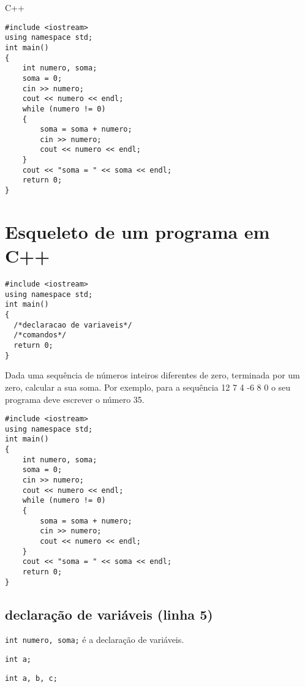 \documentclass[a4paper]{memoir}
\begin{document}
\begin{ex}[C++]
C++

\begin{lstlisting}
#include <iostream>
using namespace std;
int main()
{
    int numero, soma;
    soma = 0;
    cin >> numero;
    cout << numero << endl;
    while (numero != 0)
    {
        soma = soma + numero;
        cin >> numero;
        cout << numero << endl;
    }
    cout << "soma = " << soma << endl;
    return 0;
}
\end{lstlisting}

\end{ex}

\section{Esqueleto de um programa em C++}

\begin{lstlisting}
#include <iostream>
using namespace std;
int main()
{
  /*declaracao de variaveis*/
  /*comandos*/
  return 0;
}
\end{lstlisting}

\begin{prob}\label{prob101.cpp}
Dada uma sequência de números inteiros diferentes de zero, terminada por um zero, calcular a sua soma. Por exemplo, para a sequência 12 7 4 -6 8 0 o seu programa deve escrever o número 35.
\end{prob}

\begin{sol}
\begin{lstlisting}
#include <iostream>
using namespace std;
int main()
{
    int numero, soma;
    soma = 0;
    cin >> numero;
    cout << numero << endl;
    while (numero != 0)
    {
        soma = soma + numero;
        cin >> numero;
        cout << numero << endl;
    }
    cout << "soma = " << soma << endl;
    return 0;
}
\end{lstlisting}

\end{sol}

\subsection*{declaração de variáveis (linha 5)}

\verb|int numero, soma;| é a declaração de variáveis.

\verb|int a;|

\verb|int a, b, c;|
\end{document}
